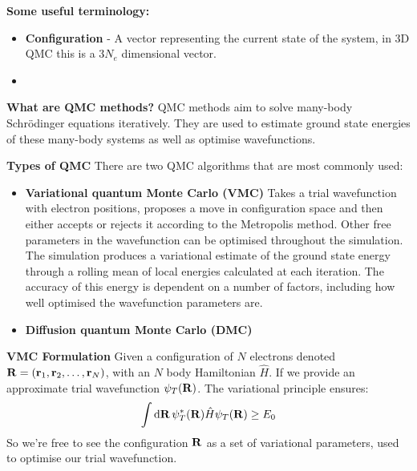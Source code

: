 \documentclass[10pt]{beamer}
\begin{document}
\begin{frame}[allowframebreaks]
    \textbf{Some useful terminology:}\medskip\newline
    \begin{itemize}
        \item[\textbullet] \textbf{Configuration} - A vector representing the current state of the system, in 3D QMC this is a $3N_e$ dimensional vector.
        \item[\textbullet] \textbf{}
    \end{itemize}

    \textbf{What are QMC methods?}\medskip\newline
    QMC methods aim to solve many-body Schr\"odinger equations iteratively. They are used to estimate ground state energies of these many-body systems as well as optimise wavefunctions.\medskip\newline
    \framebreak

    \textbf{Types of QMC}\medskip\newline
    There are two QMC algorithms that are most commonly used:
    \begin{itemize}
        \item[\textbullet] \textbf{Variational quantum Monte Carlo (VMC)}\newline
        Takes a trial wavefunction with electron positions, proposes a move in configuration space and then either accepts or rejects it according to the Metropolis method.\newline
        Other free parameters in the wavefunction can be optimised throughout the simulation. The simulation produces a variational estimate of the ground state energy through a rolling mean of local energies calculated at each iteration. The accuracy of this energy is dependent on a number of factors, including how well optimised the wavefunction parameters are.\newline
    \item[\textbullet] \textbf{Diffusion quantum Monte Carlo (DMC)}
    \end{itemize}
    \framebreak

    \textbf{VMC Formulation}\medskip\newline
    Given a configuration of $N$ electrons denoted
    $\vb{R}=\pqty{\vb{r}_1,\vb{r}_2,\ldots,\vb{r}_N}$, with an $N$
    body Hamiltonian $\hat{H}$.\newline
    If we provide an approximate trial wavefunction $\psi_T\pqty{\vb{R}}$. The
    variational principle ensures:
    \begin{equation}
        \int\dd{\vb{R}}\psi_T^*\pqty{\vb{R}}\hat{H}\psi_T\pqty{\vb{R}}\geq E_0
    \end{equation}
    So we're free to see the configuration $\vb{R}$ as a set of variational
    parameters, used to optimise our trial wavefunction.
    \framebreak


\end{frame}
\end{document}
